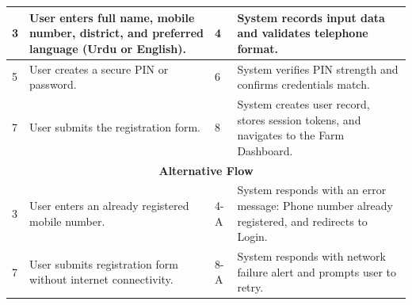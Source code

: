 \documentclass{FastFyp}
\begin{document}
\begin{table}[!ht]
\begin{tabular}{|lllll|}
\multicolumn{1}{|p{0.8cm}|}{3} &
  \multicolumn{2}{p{6.0cm}|}{User enters full name, mobile number, district, and preferred language (Urdu or English).} &
  \multicolumn{1}{p{0.8cm}|}{4} &
  \multicolumn{1}{p{5.6cm}|}{System records input data and validates telephone format.} \\ \hline
\multicolumn{1}{|p{0.8cm}|}{5} &
  \multicolumn{2}{p{6.0cm}|}{User creates a secure PIN or password.} &
  \multicolumn{1}{p{0.8cm}|}{6} &
  \multicolumn{1}{p{5.6cm}|}{System verifies PIN strength and confirms credentials match.} \\ \hline
\multicolumn{1}{|p{0.8cm}|}{7} &
  \multicolumn{2}{p{6.0cm}|}{User submits the registration form.} &
  \multicolumn{1}{p{0.8cm}|}{8} &
  \multicolumn{1}{p{5.6cm}|}{System creates user record, stores session tokens, and navigates to the Farm Dashboard.} \\ \hline
\multicolumn{5}{|c|}{\textbf{Alternative Flow}} \\ \hline
\multicolumn{1}{|p{0.8cm}|}{3} &
  \multicolumn{2}{p{6.0cm}|}{User enters an already registered mobile number.} &
  \multicolumn{1}{p{0.8cm}|}{4-A} &
  \multicolumn{1}{p{5.6cm}|}{System responds with an error message: Phone number already registered, and redirects to Login.} \\ \hline
\multicolumn{1}{|p{0.8cm}|}{7} &
  \multicolumn{2}{p{6.0cm}|}{User submits registration form without internet connectivity.} &
  \multicolumn{1}{p{0.8cm}|}{8-A} &
  \multicolumn{1}{p{5.6cm}|}{System responds with network failure alert and prompts user to retry.} \\ \hline
\end{tabular}
\end{table}

\end{document}
